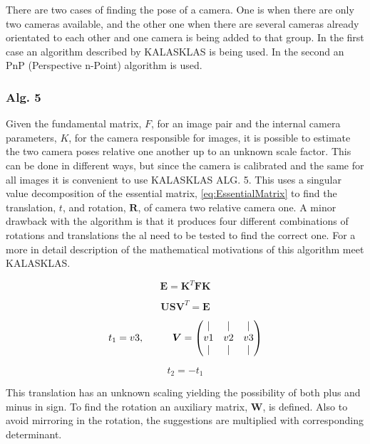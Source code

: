 There are two cases of finding the pose of a camera. One is when there are only two cameras available, and the other one when there are several cameras already orientated to each other and one camera is being added to that group. In the first case an algorithm described by KALASKLAS is being used. In the second an PnP (Perspective n-Point) algorithm is used.

\subsubsection{Alg. 5}
Given the fundamental matrix, $F$, for an image pair and the internal camera parameters, $K$, for the camera responsible for images, it is possible to estimate the two camera poses relative one another up to an unknown scale factor. This can be done in different ways, but since the camera is calibrated and the same for all images it is convenient to use KALASKLAS ALG. 5. This uses a singular value decomposition of the essential matrix, \eqref{eq:EssentialMatrix} to find the translation, $t$, and rotation, $\boldsymbol{R}$, of camera two relative camera one. A minor drawback with the algorithm is that it produces four different combinations of rotations and translations the al need to be tested to find the correct one. For a more in detail description of the mathematical motivations of this algorithm meet KALASKLAS. 

\begin{equation}
\label{eq:EssentialMatrix}
\boldsymbol{E} = \boldsymbol{K}^T \boldsymbol{FK}
\end{equation}

\begin{equation}
\boldsymbol{U S V}^T = \boldsymbol{E}
\end{equation}

\begin{equation}
t_1 = v3, \hspace{1 cm}  \boldsymbol{V} = \begin{pmatrix}
										 |  & |  & |  \\
										 v1 & v2 & v3 \\
										 |  & |  & |
										\end{pmatrix}
\end{equation}

\begin{equation}
t_2 = -t_1
\end{equation}

This translation has an unknown scaling yielding the possibility of both plus and minus in sign. To find the rotation an auxiliary matrix, $\boldsymbol{W}$, is defined. Also to avoid mirroring in the rotation, the suggestions are multiplied with corresponding determinant.

